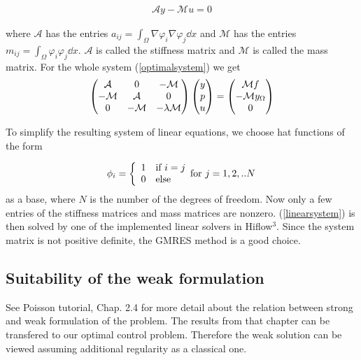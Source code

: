 \documentclass[a4paper, 11pt, twoside]{article}
\begin{document}
\begin{eqnarray}
\mathcal{A} y - \mathcal{M} u = 0
\end{eqnarray}

where $\mathcal A$ has the entries $a_{ij} = \int_\Omega \nabla \varphi_i \nabla \varphi_j \dd x$ and $\mathcal M$ has the entries $m_{ij} = \int_\Omega \varphi_i \varphi_j \dd x$. $\mathcal A$ is called the stiffness matrix and $\mathcal M$ is called the mass matrix. For the whole system (\ref{optimalsystem}) we get 
\begin{eqnarray}\label{linearsystem}\index{linear system}
\begin{pmatrix}
\mathcal A & 0 & -\mathcal M \\
-\mathcal M &\mathcal A & 0 \\
0 & -\mathcal M & -\lambda \mathcal M 
\end{pmatrix}
\begin{pmatrix}
y \\
p \\
u
\end{pmatrix}
=
\begin{pmatrix}
\mathcal M f \\
- \mathcal My_\Omega \\
0
\end{pmatrix}
\end{eqnarray}



To simplify the resulting system of linear equations, we choose hat functions of the form

\begin{equation}\index{hat functions}
\phi_i =
\left\{
	\begin{array}{ll}
		1  & \mbox{if } i = j \\
		0 & \mbox{else } 
	\end{array}
	\text{for } j = 1,2,..N
\right.
\end{equation}
as a base, where $N$ is the number of the degrees of freedom. Now only a few entries of the stiffness matrices and mass matrices are nonzero. (\ref{linearsystem}) is then solved by one of the implemented linear solvers in Hiflow$^3$. Since the system matrix is not positive definite, the GMRES method is a good choice.



\subsection{Suitability of the weak formulation}
See Poisson tutorial, Chap. 2.4 for more detail about the relation between strong and weak formulation of the problem. The results from that chapter can be transfered to our optimal control problem. Therefore the weak solution can be viewed assuming additional regularity as a classical one.
\end{document}
